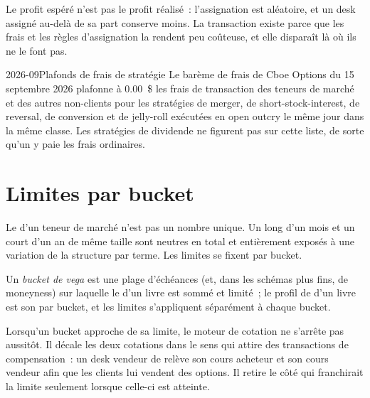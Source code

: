 Le profit espéré n'est pas le profit réalisé~: l'assignation est aléatoire, et un desk assigné au-delà de sa part conserve moins. La transaction existe parce que
les frais et les règles d'assignation la rendent peu coûteuse, et elle disparaît là où ils ne le font pas.

\begin{dated}{2026-09}{Plafonds de frais de stratégie}\label{dat:dv:options-market-making-in-practice:fees}
Le barème de frais de Cboe Options du 15 septembre 2026 plafonne à 0.00~\$ les frais de transaction des teneurs de marché et des autres non-clients pour les stratégies de merger, de short-stock-interest, de reversal,
de conversion et de jelly-roll exécutées en open outcry le même jour dans la même classe. Les stratégies de dividende ne figurent pas sur cette liste, de sorte qu'un 
y paie les frais ordinaires.
\end{dated}

\section{Limites par bucket}

Le  d'un teneur de marché n'est pas un nombre unique. Un  long d'un mois et un  court d'un an de même taille sont neutres en total et entièrement exposés à une variation de la
structure par terme. Les limites se fixent par bucket.

\begin{definition}\label{def:dv:options-market-making-in-practice:bucket}
Un \emph{bucket de vega} est une plage d'échéances (et, dans les schémas plus fins, de moneyness) sur laquelle le  d'un livre est sommé et limité~; le profil de  d'un livre
est son  par bucket, et les limites s'appliquent séparément à chaque bucket.
\end{definition}

Lorsqu'un bucket approche de sa limite, le moteur de cotation ne s'arrête pas aussitôt. Il décale les deux cotations dans le sens qui attire des transactions de compensation~: un desk
vendeur de  relève son cours acheteur et son cours vendeur afin que les clients lui vendent des options. Il retire le côté qui franchirait la limite seulement lorsque celle-ci est atteinte.

